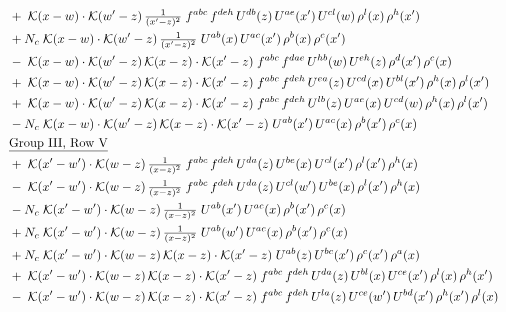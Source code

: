 \documentclass[10pt]{article}
\numberwithin{equation}{section}
\begin{document}
\begin{align}
&\quad +\;\mathcal{K}(x-w)\cdot\mathcal{K}(w'-z)\,\tfrac{1}{(x'-z)^{2}}\;f^{abc}\,f^{deh}\,U^{db}(z)\,U^{ae}(x')\,U^{cl}(w)\,\rho^{l}(x)\,\rho^{h}(x')\notag\\
&\quad +N_c\;\mathcal{K}(x-w)\cdot\mathcal{K}(w'-z)\,\tfrac{1}{(x'-z)^{2}}\;U^{ab}(x)\,U^{ac}(x')\,\rho^{b}(x)\,\rho^{c}(x')\notag\\
&\quad -\;\mathcal{K}(x-w)\cdot\mathcal{K}(w'-z)\,\mathcal{K}(x-z)\cdot\mathcal{K}(x'-z)\;f^{abc}\,f^{dae}\,U^{hb}(w)\,U^{eh}(z)\,\rho^{d}(x')\,\rho^{c}(x)\notag\\
&\quad +\;\mathcal{K}(x-w)\cdot\mathcal{K}(w'-z)\,\mathcal{K}(x-z)\cdot\mathcal{K}(x'-z)\;f^{abc}\,f^{deh}\,U^{ea}(z)\,U^{cd}(x)\,U^{bl}(x')\,\rho^{h}(x)\,\rho^{l}(x')\notag\\
&\quad +\;\mathcal{K}(x-w)\cdot\mathcal{K}(w'-z)\,\mathcal{K}(x-z)\cdot\mathcal{K}(x'-z)\;f^{abc}\,f^{deh}\,U^{lb}(z)\,U^{ae}(x)\,U^{cd}(w)\,\rho^{h}(x)\,\rho^{l}(x')\notag\\
&\quad -N_c\;\mathcal{K}(x-w)\cdot\mathcal{K}(w'-z)\,\mathcal{K}(x-z)\cdot\mathcal{K}(x'-z)\;U^{ab}(x')\,U^{ac}(x)\,\rho^{b}(x')\,\rho^{c}(x)\notag\\
&\quad\underline{\text{Group III, Row V}}\notag\\
&\quad +\;\mathcal{K}(x'-w')\cdot\mathcal{K}(w-z)\,\tfrac{1}{(x-z)^{2}}\;f^{abc}\,f^{deh}\,U^{da}(z)\,U^{be}(x)\,U^{cl}(x')\,\rho^{l}(x')\,\rho^{h}(x)\notag\\
&\quad -\;\mathcal{K}(x'-w')\cdot\mathcal{K}(w-z)\,\tfrac{1}{(x-z)^{2}}\;f^{abc}\,f^{deh}\,U^{da}(z)\,U^{cl}(w')\,U^{be}(x)\,\rho^{l}(x')\,\rho^{h}(x)\notag\\
&\quad -N_c\;\mathcal{K}(x'-w')\cdot\mathcal{K}(w-z)\,\tfrac{1}{(x-z)^{2}}\;U^{ab}(x')\,U^{ac}(x)\,\rho^{b}(x')\,\rho^{c}(x)\notag\\
&\quad +N_c\;\mathcal{K}(x'-w')\cdot\mathcal{K}(w-z)\,\tfrac{1}{(x-z)^{2}}\;U^{ab}(w')\,U^{ac}(x)\,\rho^{b}(x')\,\rho^{c}(x)\notag\\
&\quad +N_c\;\mathcal{K}(x'-w')\cdot\mathcal{K}(w-z)\,\mathcal{K}(x-z)\cdot\mathcal{K}(x'-z)\;U^{ab}(z)\,U^{bc}(x')\,\rho^{c}(x')\,\rho^{a}(x)\notag\\
&\quad +\;\mathcal{K}(x'-w')\cdot\mathcal{K}(w-z)\,\mathcal{K}(x-z)\cdot\mathcal{K}(x'-z)\;f^{abc}\,f^{deh}\,U^{da}(z)\,U^{bl}(x)\,U^{ce}(x')\,\rho^{l}(x)\,\rho^{h}(x')\notag\\
&\quad -\;\mathcal{K}(x'-w')\cdot\mathcal{K}(w-z)\,\mathcal{K}(x-z)\cdot\mathcal{K}(x'-z)\;f^{abc}\,f^{deh}\,U^{la}(z)\,U^{ce}(w')\,U^{bd}(x')\,\rho^{h}(x')\,\rho^{l}(x)\notag\\

\end{align}
\end{document}
